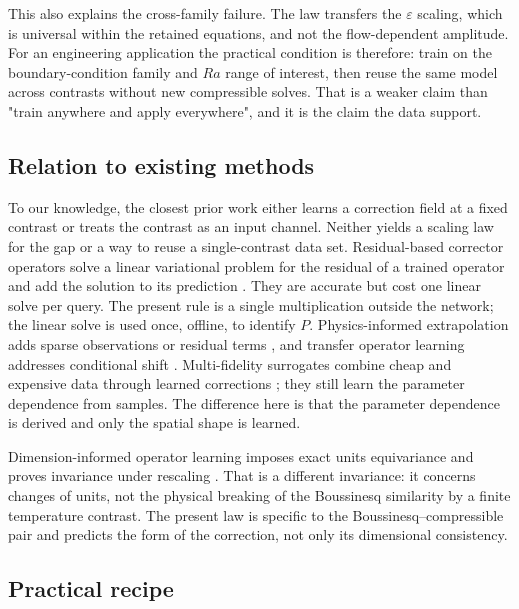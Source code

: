 \documentclass[preprint,11pt,a4paper,times]{elsarticle}
\begin{document}
This also explains the cross-family failure. The law transfers the $\varepsilon$ scaling,
which is universal within the retained equations, and not the flow-dependent amplitude. For an
engineering application the practical condition is therefore: train on the boundary-condition
family and $Ra$ range of interest, then reuse the same model across contrasts without new
compressible solves. That is a weaker claim than "train anywhere and apply everywhere", and it
is the claim the data support.

\subsection{Relation to existing methods}

To our knowledge, the closest prior work either learns a correction field at a fixed contrast or
treats the contrast as an input channel. Neither yields a scaling law for the gap or a way to
reuse a single-contrast data set. Residual-based corrector operators solve a linear variational problem for the residual of a
trained operator and add the solution to its prediction \citep{jha2023residual,cao2023residual}.
They are accurate but cost one linear solve per query. The present rule is a single
multiplication outside the network; the linear solve is used once, offline, to identify $P$.
Physics-informed extrapolation adds sparse observations or residual terms
\citep{zhu2023reliable}, and transfer operator learning addresses conditional shift
\citep{goswami2022deep}. Multi-fidelity surrogates combine cheap and expensive data through
learned corrections \citep{conti2022multi,chen2023feature,lyu2023multi}; they still learn the
parameter dependence from samples. The difference here is that the parameter dependence is
derived and only the spatial shape is learned.

Dimension-informed operator learning imposes exact units equivariance and proves invariance
under rescaling \citep{song2024dimino}. That is a different invariance: it concerns changes of
units, not the physical breaking of the Boussinesq similarity by a finite temperature
contrast. The present law is specific to the Boussinesq--compressible pair and predicts the
form of the correction, not only its dimensional consistency.

\subsection{Practical recipe}
\end{document}
